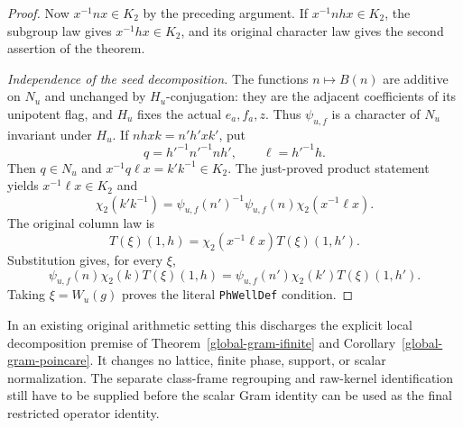\begin{proof}
Now $x^{-1}nx\in K_2$ by the preceding argument.  If
$x^{-1}nhx\in K_2$, the subgroup law gives
$x^{-1}hx\in K_2$, and its original character law gives the
second assertion of the theorem.

\emph{Independence of the seed decomposition.}
The functions $n\mapsto B(n)$ are additive on $N_u$ and
unchanged by $H_u$-conjugation: they are the adjacent
coefficients of its unipotent flag, and $H_u$ fixes the actual
$e_a,f_a,z$.  Thus $\psi_{u,f}$ is a character of $N_u$
invariant under $H_u$.  If
$nhxk=n'h'xk'$, put
\[
 q=h'^{-1}n'^{-1}nh',\qquad \ell=h'^{-1}h.
\]
Then $q\in N_u$ and $x^{-1}q\ell x=k'k^{-1}\in K_2$.
The just-proved product statement yields
$x^{-1}\ell x\in K_2$ and
\[
 \chi_2(k'k^{-1})
       =\psi_{u,f}(n')^{-1}\psi_{u,f}(n)\chi_2(x^{-1}\ell x).
\]
The original column law is
\[
       T(\xi)(1,h)=\chi_2(x^{-1}\ell x)T(\xi)(1,h').
\]
Substitution gives, for every $\xi$,
\[
 \psi_{u,f}(n)\chi_2(k)T(\xi)(1,h)
 =\psi_{u,f}(n')\chi_2(k')T(\xi)(1,h').
\]
Taking $\xi=W_u(g)$ proves the literal \texttt{PhWellDef}
condition.
\end{proof}

In an existing original arithmetic setting this discharges the
explicit local decomposition premise of
Theorem~\ref{global-gram-ifinite} and
Corollary~\ref{global-gram-poincare}.  It changes no lattice,
finite phase, support, or scalar normalization.  The separate
class-frame regrouping and raw-kernel identification still have
to be supplied before the scalar Gram identity can be used as
the final restricted operator identity.
